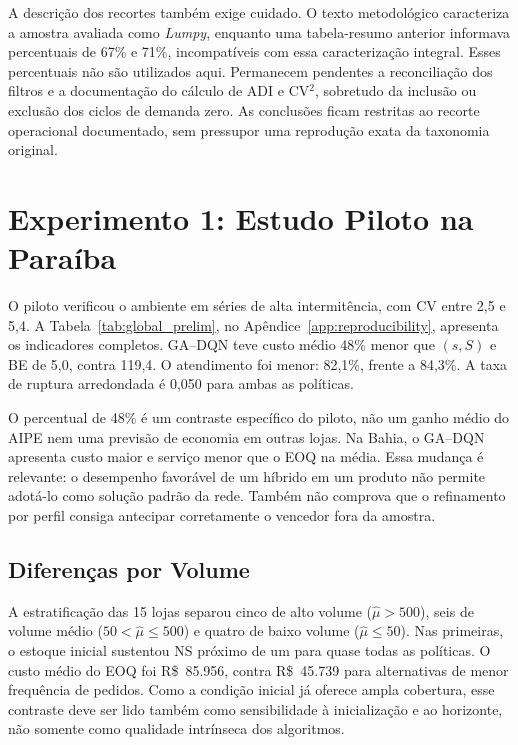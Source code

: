 A descrição dos recortes também exige cuidado. O texto metodológico caracteriza a amostra avaliada como \textit{Lumpy}, enquanto uma tabela-resumo anterior informava percentuais de 67\% e 71\%, incompatíveis com essa caracterização integral. Esses percentuais não são utilizados aqui. Permanecem pendentes a reconciliação dos filtros e a documentação do cálculo de ADI e CV$^2$, sobretudo da inclusão ou exclusão dos ciclos de demanda zero. As conclusões ficam restritas ao recorte operacional documentado, sem pressupor uma reprodução exata da taxonomia original.

\section{Experimento 1: Estudo Piloto na Paraíba}
\label{sec:experimento1}

O piloto verificou o ambiente em séries de alta intermitência, com CV entre 2,5 e 5,4. A Tabela~\ref{tab:global_prelim}, no Apêndice~\ref{app:reproducibility}, apresenta os indicadores completos. GA--DQN teve custo médio 48\% menor que $(s,S)$ e BE de 5,0, contra 119,4. O atendimento foi menor: 82,1\%, frente a 84,3\%. A taxa de ruptura arredondada é 0,050 para ambas as políticas.

O percentual de 48\% é um contraste específico do piloto, não um ganho médio do AIPE nem uma previsão de economia em outras lojas. Na Bahia, o GA--DQN apresenta custo maior e serviço menor que o EOQ na média. Essa mudança é relevante: o desempenho favorável de um híbrido em um produto não permite adotá-lo como solução padrão da rede. Também não comprova que o refinamento por perfil consiga antecipar corretamente o vencedor fora da amostra.

\subsection{Diferenças por Volume}

A estratificação das 15 lojas separou cinco de alto volume ($\hat\mu>500$), seis de volume médio ($50<\hat\mu\leq500$) e quatro de baixo volume ($\hat\mu\leq50$). Nas primeiras, o estoque inicial sustentou NS próximo de um para quase todas as políticas. O custo médio do EOQ foi R\$~85.956, contra R\$~45.739 para alternativas de menor frequência de pedidos. Como a condição inicial já oferece ampla cobertura, esse contraste deve ser lido também como sensibilidade à inicialização e ao horizonte, não somente como qualidade intrínseca dos algoritmos.

